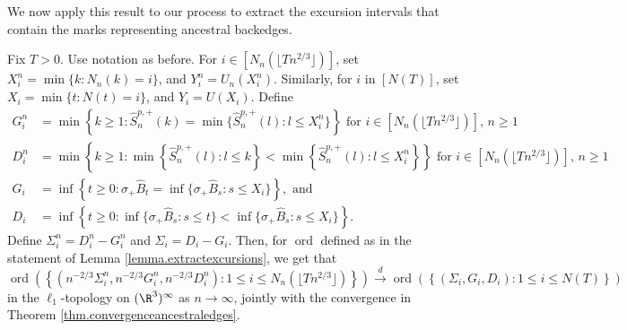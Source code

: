We now apply this result to our process to extract the excursion intervals that contain the marks representing ancestral backedges.
\begin{proposition}\label{prop.extractexcursions}
Fix $T>0$. Use notation as before. For $i\in \left[N_n\left(\lfloor T n^{2/3}\rfloor\right)\right]$, set $X_i^n=\min\{k:N_n(k)=i\}$, and $Y_i^n=U_n(X_i^n)$. Similarly, for $i$ in $\left[N(T)\right]$, set $X_i=\min\{t:N(t)=i\}$, and $Y_i=U(X_i)$. Define
\begin{align*}G_i^n&=\min\left\{k\geq 1:\hat{S}^{p,+}_n(k)=\min\{\hat{S}^{p,+}_n(l):l\leq X_i^n\}\right\}\text{ for }i\in \left[N_n\left(\lfloor T n^{2/3}\rfloor\right)\right]\text{, }n\geq 1\\
D_i^n&=\min\left\{k \geq 1: \min\left\{\hat{S}^{p,+}_n(l):l\leq k\right\} < \min\left\{\hat{S}^{p,+}_n(l):l\leq X_i^n\right\}\right\}\text{ for }i\in \left[N_n\left(\lfloor T n^{2/3}\rfloor\right)\right]\text{, }n\geq 1\\
G_i&=\inf\left\{t\geq 0:\sigma_+\hat{B}_t=\inf\{\sigma_+\hat{B}_s:s\leq X_i\}\right\},\text{ and}\\
D_i&=\inf\left\{ t\geq 0: \inf\{\sigma_+\hat{B}_s:s\leq t\} < \inf\{\sigma_+\hat{B}_s:s\leq X_i\}\right\}.
\end{align*}
Define $\Sigma_i^n=D_i^n-G_i^n$ and $\Sigma_i=D_i-G_i$. Then, for $\operatorname{ord}$ defined as in the statement of Lemma \ref{lemma.extractexcursions}, we get that
$$\operatorname{ord}\left(\left\{\left(n^{-2/3}\Sigma_i^n,n^{-2/3}G_i^n,n^{-2/3}D_i^n\right):1\leq i \leq N_n\left(\lfloor T n^{2/3}\rfloor\right)\right\}\right)\overset{d}{\to} \operatorname{ord}\left(\left\{(\Sigma_i,G_i,D_i):1\leq i \leq N(T)\right\}\right)$$
in the $\ell_1$-topology on $(\R^3)^\infty$ as $n\to \infty$, jointly with the convergence in Theorem \ref{thm.convergenceancestraledges}. 
\end{proposition}
